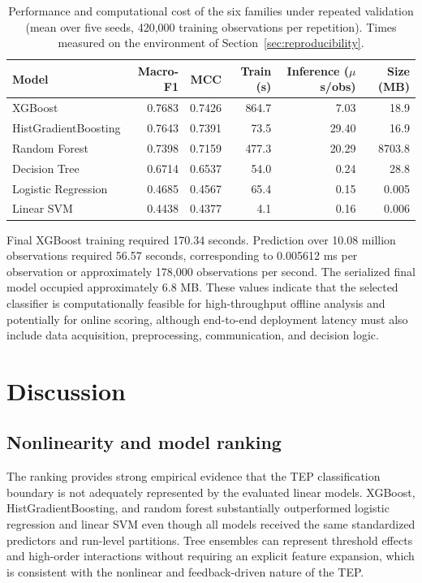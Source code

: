 \documentclass[10pt,twocolumn,a4paper]{article}
\begin{document}
\begin{table}[t]
\centering
\caption{Performance and computational cost of the six families under repeated
validation (mean over five seeds, 420,000 training observations per
repetition). Times measured on the environment of
Section~\ref{sec:reproducibility}.}
\label{tab:cost}
\small
\begin{tabular}{lrrrrr}
\toprule
Model & Macro-F1 & MCC & Train (s) & Inference ($\mu$s/obs) & Size (MB)\\
\midrule
XGBoost              & 0.7683 & 0.7426 & 864.7 & 7.03 & 18.9\\
HistGradientBoosting & 0.7643 & 0.7391 & 73.5 & 29.40 & 16.9\\
Random Forest        & 0.7398 & 0.7159 & 477.3 & 20.29 & 8703.8\\
Decision Tree        & 0.6714 & 0.6537 & 54.0 & 0.24 & 28.8\\
Logistic Regression  & 0.4685 & 0.4567 & 65.4 & 0.15 & 0.005\\
Linear SVM           & 0.4438 & 0.4377 & 4.1 & 0.16 & 0.006\\
\bottomrule
\end{tabular}
\end{table}

Final XGBoost training required 170.34 seconds. Prediction over 10.08 million
observations required 56.57 seconds, corresponding to 0.005612 ms per
observation or approximately 178,000 observations per second. The serialized
final model occupied approximately 6.8 MB. These values indicate that the
selected classifier is computationally feasible for high-throughput offline
analysis and potentially for online scoring, although end-to-end deployment
latency must also include data acquisition, preprocessing, communication, and
decision logic.

\section{Discussion}

\subsection{Nonlinearity and model ranking}
\label{sec:nonlinearity}

The ranking provides strong empirical evidence that the TEP classification
boundary is not adequately represented by the evaluated linear models.
XGBoost, HistGradientBoosting, and random forest substantially outperformed
logistic regression and linear SVM even though all models received the same
standardized predictors and run-level partitions. Tree ensembles can represent
threshold effects and high-order interactions without requiring an explicit
feature expansion, which is consistent with the nonlinear and feedback-driven
nature of the TEP.
\end{document}
